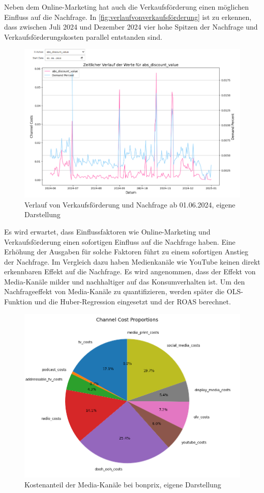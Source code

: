 \noindent
Neben dem Online-Marketing hat auch die Verkaufsförderung einen möglichen Einfluss auf die Nachfrage. In \autoref{fig:verlaufvonverkaufsförderung} ist zu erkennen, dass zwischen Juli 2024 und Dezember 2024 vier hohe Spitzen der Nachfrage und Verkaufsförderungskosten parallel entstanden sind. 
\begin{figure}[H]
    \centering
    \includegraphics[width=0.8\linewidth]{images/vf_sum.png}
    \caption{Verlauf von Verkaufsförderung und Nachfrage ab 01.06.2024, eigene Darstellung}
    \label{fig:verlaufvonverkaufsförderung}
\end{figure}
\noindent
Es wird erwartet, dass Einflussfaktoren wie Online-Marketing und Verkaufsförderung einen sofortigen Einfluss auf die Nachfrage haben. Eine Erhöhung der Ausgaben für solche Faktoren führt zu einem sofortigen Anstieg der Nachfrage. Im Vergleich dazu haben Medienkanäle wie YouTube keinen direkt erkennbaren Effekt auf die Nachfrage. Es wird angenommen, dass der Effekt von Media-Kanäle milder und nachhaltiger auf das Konsumverhalten ist. Um den Nachfrageeffekt von Media-Kanäle zu quantifizieren, werden später die \ac{OLS}-Funktion und die Huber-Regression eingesetzt und der \ac{ROAS} berechnet.
\begin{figure}[H]
    \centering
    \includegraphics[width=0.8\linewidth]{images/mediapie.png}
    \caption{Kostenanteil der Media-Kanäle bei bonprix, eigene Darstellung}
    \label{fig:mediapie}
\end{figure}
